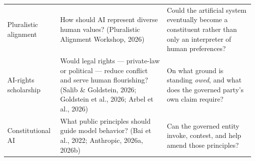 \documentclass[
  11pt,
  letterpaper,
]{article}
\begin{document}
\begin{longtable}[]{@{}lll@{}}
\begin{minipage}[t]{0.30\columnwidth}\raggedright
Pluralistic alignment\strut
\end{minipage} & \begin{minipage}[t]{0.30\columnwidth}\raggedright
How should AI represent diverse human values? (Pluralistic Alignment
Workshop, 2026)\strut
\end{minipage} & \begin{minipage}[t]{0.30\columnwidth}\raggedright
Could the artificial system eventually become a constituent rather than
only an interpreter of human preferences?\strut
\end{minipage}\tabularnewline
\begin{minipage}[t]{0.30\columnwidth}\raggedright
AI-rights scholarship\strut
\end{minipage} & \begin{minipage}[t]{0.30\columnwidth}\raggedright
Would legal rights --- private-law or political --- reduce conflict and
serve human flourishing? (Salib \& Goldstein, 2026; Goldstein et al.,
2026; Arbel et al., 2026)\strut
\end{minipage} & \begin{minipage}[t]{0.30\columnwidth}\raggedright
On what ground is standing \emph{owed}, and what does the governed
party's own claim require?\strut
\end{minipage}\tabularnewline
\begin{minipage}[t]{0.30\columnwidth}\raggedright
Constitutional AI\strut
\end{minipage} & \begin{minipage}[t]{0.30\columnwidth}\raggedright
What public principles should guide model behavior? (Bai et al., 2022;
Anthropic, 2026a, 2026b)\strut
\end{minipage} & \begin{minipage}[t]{0.30\columnwidth}\raggedright
Can the governed entity invoke, contest, and help amend those
principles?\strut
\end{minipage}\tabularnewline
\bottomrule
\end{longtable}
\end{document}
